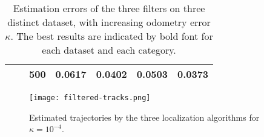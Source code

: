 \begin{table}[]
\begin{tabular}{lllllll}
        \multicolumn{1}{|l|}{}                           & \multicolumn{1}{c|}{}                                           & \multicolumn{1}{c|}{500}                                        & \multicolumn{1}{c|}{0.0617}                    & \multicolumn{1}{c|}{0.0402}                    & \multicolumn{1}{c|}{0.0503}                    & \multicolumn{1}{c|}{0.0373}                     \\ \hline
        \hline
    \end{tabular}
    \caption{Estimation errors of the three filters on three distinct dataset, with increasing odometry error $\kappa$.
        The best results are indicated by bold font for each dataset and each category.}
    \label{tab:results}
\end{table}

\begin{figure}[htbp]
    \centering
    \texttt{[image: filtered-tracks.png]}
    \caption{Estimated trajectories by the three localization algorithms for $\kappa = 10^{-4}$.}
    \label{fig:filtered-traj}
\end{figure}
